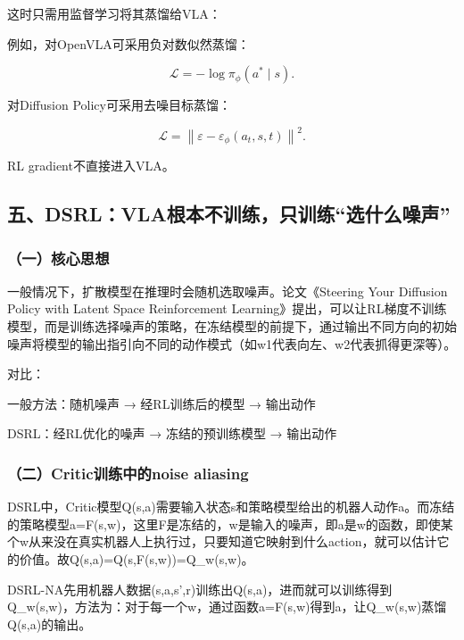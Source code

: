 这时只需用监督学习将其蒸馏给VLA：

例如，对OpenVLA可采用负对数似然蒸馏：

\[
\mathcal{L}=-\log\pi_\phi(a^\ast\mid s).
\]

对Diffusion Policy可采用去噪目标蒸馏：

\[
\mathcal{L}=\left\|\varepsilon-\varepsilon_\phi(a_t,s,t)\right\|^2.
\]

RL gradient不直接进入VLA。

\hypertarget{ux4e94dsrlvlaux6839ux672cux4e0dux8badux7ec3ux53eaux8badux7ec3ux9009ux4ec0ux4e48ux566aux58f0}{%
\subsection{五、DSRL：VLA根本不训练，只训练``选什么噪声''}\label{ux4e94dsrlvlaux6839ux672cux4e0dux8badux7ec3ux53eaux8badux7ec3ux9009ux4ec0ux4e48ux566aux58f0}}

\hypertarget{ux4e00ux6838ux5fc3ux601dux60f3-16}{%
\subsubsection{（一）核心思想}\label{ux4e00ux6838ux5fc3ux601dux60f3-16}}

一般情况下，扩散模型在推理时会随机选取噪声。论文《Steering Your Diffusion Policy with Latent Space Reinforcement Learning》提出，可以让RL梯度不训练模型，而是训练选择噪声的策略，在冻结模型的前提下，通过输出不同方向的初始噪声将模型的输出指引向不同的动作模式（如w1代表向左、w2代表抓得更深等）。

对比：

一般方法：随机噪声 → 经RL训练后的模型 → 输出动作

DSRL：经RL优化的噪声 → 冻结的预训练模型 → 输出动作

\hypertarget{ux4e8ccriticux8badux7ec3ux4e2dux7684noise-aliasing}{%
\subsubsection{（二）Critic训练中的noise aliasing}\label{ux4e8ccriticux8badux7ec3ux4e2dux7684noise-aliasing}}

DSRL中，Critic模型Q(s,a)需要输入状态s和策略模型给出的机器人动作a。而冻结的策略模型a=F(s,w)，这里F是冻结的，w是输入的噪声，即a是w的函数，即使某个w从来没在真实机器人上执行过，只要知道它映射到什么action，就可以估计它的价值。故Q(s,a)=Q(s,F(s,w))=Q\_w(s,w)。

DSRL-NA先用机器人数据(s,a,s',r)训练出Q(s,a)，进而就可以训练得到Q\_w(s,w)，方法为：对于每一个w，通过函数a=F(s,w)得到a，让Q\_w(s,w)蒸馏Q(s,a)的输出。


